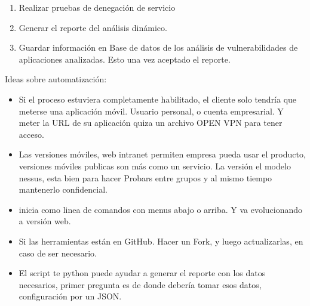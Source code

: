 \documentclass[letterpaper,12pt]{extarticle}
\begin{document}
\begin{enumerate}
\item Realizar pruebas de denegación de servicio
	\item Generar el reporte del análisis dinámico.
	\item Guardar información en Base de datos de los análisis de vulnerabilidades de aplicaciones analizadas. Esto una vez aceptado el reporte.
\end{enumerate}


Ideas sobre automatización:

\begin{itemize}
    \item Si el proceso estuviera completamente habilitado, el cliente solo tendría que meterse una aplicación móvil. Usuario personal, o cuenta empresarial. Y meter la URL de su aplicación quiza un archivo OPEN VPN para tener acceso.
    \item Las versiones móviles, web intranet permiten empresa pueda usar el producto, versiones móviles publicas son más como un servicio. La versión el modelo nessus, esta bien para hacer Probars entre grupos y al mismo tiempo mantenerlo confidencial.    
    \item inicia como linea de comandos con menus abajo o arriba. Y va evolucionando a versión web. 
    \item Si las herramientas están en GitHub. Hacer un Fork, y luego actualizarlas, en caso de ser necesario.
    \item El script te python puede ayudar a generar el reporte con los datos necesarios, primer pregunta es de donde debería tomar esos datos, configuración por un JSON.
\end{itemize}
\end{document}
